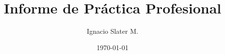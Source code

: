 \title{Informe de Práctica Profesional}
\author{Ignacio Slater M.}
\date{\today}

\newcommand{\subtitulo}{Solar Tracker Reckoner}
\newcommand{\codigoCurso}{CC5901}
\newcommand{\nombreCurso}{Práctica Profesional II}
\newcommand{\logo}{logos/LogoDCC.png}
\newcommand{\ciudad}{Santiago}
\newcommand{\pais}{Chile}

\newcommand{\telefono}{(+56) 9 9158 5187}
\newcommand{\rut}{19.133.399-3}
\newcommand{\mail}{ignacio.slater@ug.uchile.cl}

\newcommand{\inicioPractica}{19/01/2020}
\newcommand{\finPractica}{28/02/2020}